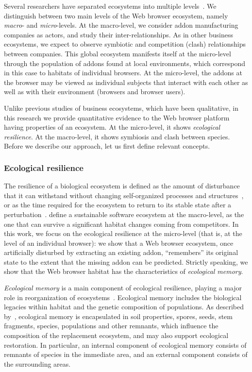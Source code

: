\documentclass[ijoc,nonblindrev]{informs3} %
\numberwithin{equation}{subsection}
\begin{document}
Several researchers have separated ecosystems into multiple levels~\citep{boucharas2009formalizing, jansen2013defining}. We distinguish between two main levels of the Web browser ecosystem, namely \emph{macro}- and \emph{micro}-levels. At the macro-level, we consider addon manufacturing companies as actors, and study their inter-relationships. As in other business ecosystems, we expect to observe symbiotic and competition (clash) relationships between companies. This global ecosystem manifests itself at the micro-level through the population of addons found at local environments, which correspond in this case to habitats of individual browsers. At the micro-level, the addons at the browser may be viewed as individual subjects that interact with each other as well as with their environment (browsers and browser users).

Unlike previous studies of business ecosystems, which have been qualitative, in this research we provide quantitative evidence to the Web browser platform having properties of an ecosystem. At the micro-level, it shows {\it ecological resilience}. At the macro-level, it shows symbiosis and clash between species. Before we describe our approach, let us first define relevant concepts.

\subsubsection{Ecological resilience}
\label{sec:eco_resilience}

The resilience of a biological ecosystem is defined as the amount of disturbance that it can withstand without changing self-organized processes and structures~\citep{holling1973resilience}, or as the time required for the ecosystem to return to its stable state after a perturbation~\citep{tilman1996biodiversity}. \cite{dhungana2010software} define a sustainable software ecosystem at the macro-level, as the one that can survive a significant habitat changes coming from competitors. In this work, we focus on the ecological resilience at the micro-level (that is, at the level of an individual browser): we show that a Web browser ecosystem, once artificially disturbed by extracting an existing addon, ``remembers'' its original state to the extent that the missing addon can be predicted. Strictly speaking, we show that the Web browser habitat has the characteristics of \emph{ecological memory}.

\emph{Ecological memory} is a main component of ecological resilience, playing a major role in reorganization of ecosystems~\citep{gunderson2000ecological}. Ecological memory includes the biological legacies within habitat and the genetic composition of populations. As described by~\cite{schaefer2009alien}, ecological memory is encapsulated in soil properties, spores, seeds, stem fragments, species, populations and other remnants, which influence the composition of the replacement ecosystem, and may also support ecological restoration. In particular, an internal component of ecological memory consists of remnants of species in the immediate area, and an external component consists of the surrounding areas. 
\end{document}
